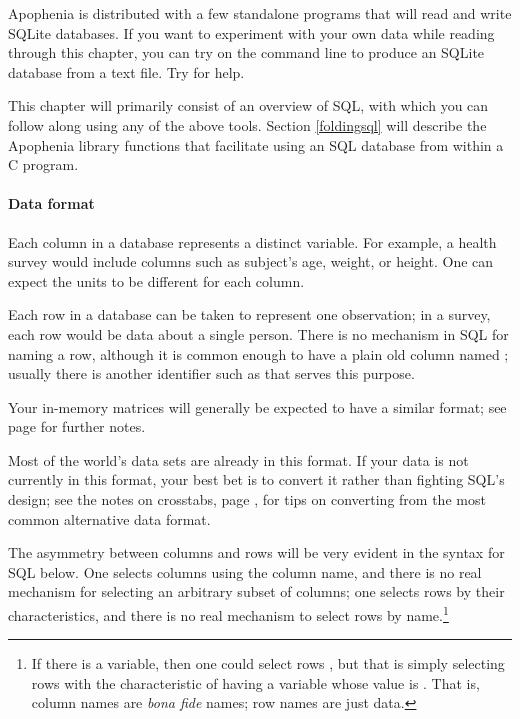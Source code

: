 Apophenia is distributed with a few standalone
programs that will read and write SQLite databases. If you want to
experiment with your own data while reading through this chapter, you can
try  on the command line to produce an SQLite
database from a text file. Try  for help.

This chapter will primarily consist of an overview of SQL, with which you can
follow along using any of the above tools. Section \ref{foldingsql}
will describe the Apophenia library functions that facilitate using an
SQL database from within a C program.

\paragraph{Data format} Each column in a database represents a distinct
variable. For example, a health survey would include columns such
as subject's age, weight, or height. One can expect the units to be
different for each column.

Each row in a database can be taken to represent one observation; in a
survey, each row would be data about a single person. There is no
mechanism in SQL for naming a row, although it is common enough to
have a plain old column named ; usually there is
another identifier such as  that serves
this purpose.  

Your in-memory matrices will generally be expected to have a similar
format; see page \pageref{dataformats} for further notes.

Most of the world's data sets are already in this format. If your data 
is not currently in this format, your best bet is to convert it rather
than fighting SQL's design; see
the notes on crosstabs, page \pageref{crosstabs}, for tips on
converting from the most common alternative data format.

The asymmetry between columns and rows will be very
evident in the syntax for SQL below. 
One selects columns using the
column name, and there is no real mechanism for selecting an arbitrary
subset of columns; one selects rows by their characteristics, and there
is no real mechanism to select rows by name.\footnote{If there is a
 variable, then one could select rows , but that is simply selecting rows with the
characteristic of having a  variable whose value is
. That is, column names are {\it bona fide} names; row
names are just data.}

